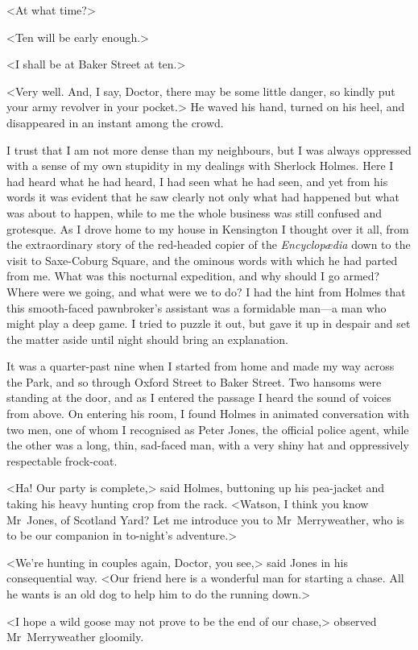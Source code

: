 <At what time?>

<Ten will be early enough.>

<I shall be at Baker Street at ten.>

<Very well. And, I say, Doctor, there may be some little danger, so kindly put your army revolver in your pocket.> He waved his hand, turned on his heel, and disappeared in an instant among the crowd.

I trust that I am not more dense than my neighbours, but I was always oppressed with a sense of my own stupidity in my dealings with Sherlock Holmes. Here I had heard what he had heard, I had seen what he had seen, and yet from his words it was evident that he saw clearly not only what had happened but what was about to happen, while to me the whole business was still confused and grotesque. As I drove home to my house in Kensington I thought over it all, from the extraordinary story of the red-headed copier of the \textit{Encyclopædia} down to the visit to Saxe-Coburg Square, and the ominous words with which he had parted from me. What was this nocturnal expedition, and why should I go armed? Where were we going, and what were we to do? I had the hint from Holmes that this smooth-faced pawnbroker's assistant was a formidable man—a man who might play a deep game. I tried to puzzle it out, but gave it up in despair and set the matter aside until night should bring an explanation.

It was a quarter-past nine when I started from home and made my way across the Park, and so through Oxford Street to Baker Street. Two hansoms were standing at the door, and as I entered the passage I heard the sound of voices from above. On entering his room, I found Holmes in animated conversation with two men, one of whom I recognised as Peter Jones, the official police agent, while the other was a long, thin, sad-faced man, with a very shiny hat and oppressively respectable frock-coat.

<Ha! Our party is complete,> said Holmes, buttoning up his pea-jacket and taking his heavy hunting crop from the rack. <Watson, I think you know Mr~Jones, of Scotland Yard? Let me introduce you to Mr~Merryweather, who is to be our companion in to-night's adventure.>

<We're hunting in couples again, Doctor, you see,> said Jones in his consequential way. <Our friend here is a wonderful man for starting a chase. All he wants is an old dog to help him to do the running down.>

<I hope a wild goose may not prove to be the end of our chase,> observed Mr~Merryweather gloomily.

